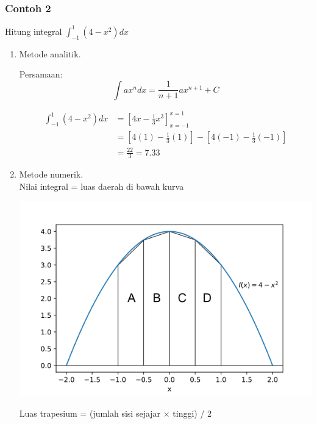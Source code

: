 \documentclass[pdflatex,compress,mathserif]{beamer}
\begin{document}
\begin{frame}
	\frametitle{Contoh 2}
	
	Hitung integral $ \int_{-1}^{1} (4 - x^2) dx $
	
	\begin{enumerate}
		\item Metode analitik.
		
		Persamaan: 
		\begin{equation*}
			\int ax^n dx = \frac{1}{n+1}ax^{n+1} + C
		\end{equation*}
		
		\begin{align*}
			\int_{-1}^{1} (4 - x^2) dx &= \left[4x - \frac{1}{3}x^3\right]^{x=1}_{x=-1} \\
			&=\left[ 4(1) - \frac{1}{3}(1) \right] - \left[ 4(-1) - \frac{1}{3}(-1) \right] \\
			&= \frac{22}{3} = 7.33
		\end{align*}
	\end{enumerate}
	
\end{frame}

\begin{frame}
	\begin{enumerate}
		\setcounter{enumi}{1}
		\item Metode numerik. \\
		
		Nilai integral = luas daerah di bawah kurva
		
		\begin{center}
			\includegraphics[width=0.6\linewidth]{img/img003}
		\end{center}
		
		Luas trapesium = (jumlah sisi sejajar $\times$ tinggi) / 2
	\end{enumerate}
\end{frame}
\end{document}
